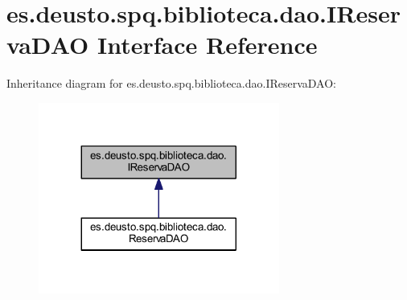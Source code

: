 \hypertarget{interfacees_1_1deusto_1_1spq_1_1biblioteca_1_1dao_1_1_i_reserva_d_a_o}{}\section{es.\+deusto.\+spq.\+biblioteca.\+dao.\+I\+Reserva\+D\+AO Interface Reference}
\label{interfacees_1_1deusto_1_1spq_1_1biblioteca_1_1dao_1_1_i_reserva_d_a_o}


Inheritance diagram for es.\+deusto.\+spq.\+biblioteca.\+dao.\+I\+Reserva\+D\+AO\+:
\nopagebreak
\begin{figure}[H]
\begin{center}
\leavevmode
\includegraphics[width=224pt]{interfacees_1_1deusto_1_1spq_1_1biblioteca_1_1dao_1_1_i_reserva_d_a_o__inherit__graph}
\end{center}
\end{figure}
